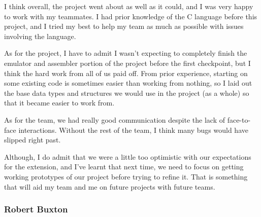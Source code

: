 \documentclass[8pt]{article}
\begin{document}
I think overall, the project went about as well as it could, and I was very happy to work with my teammates.
I had prior knowledge of the C language before this project, and I tried my best to help my team as much as possible with issues involving the language.

As for the project, I have to admit I wasn't expecting to completely finish the emulator and assembler portion of the project before the first checkpoint, but I think the hard work from all of us paid off.
From prior experience, starting on some existing code is sometimes easier than working from nothing, so I laid out the base data types and structures we would use in the project (as a whole) so that it became easier to work from.

As for the team, we had really good communication despite the lack of face-to-face interactions.
Without the rest of the team, I think many bugs would have slipped right past.

Although, I do admit that we were a little too optimistic with our expectations for the extension, and I've learnt that next time, we need to focus on getting working prototypes of our project before trying to refine it.
That is something that will aid my team and me on future projects with future teams.

\subsubsection{Robert Buxton}
\end{document}
